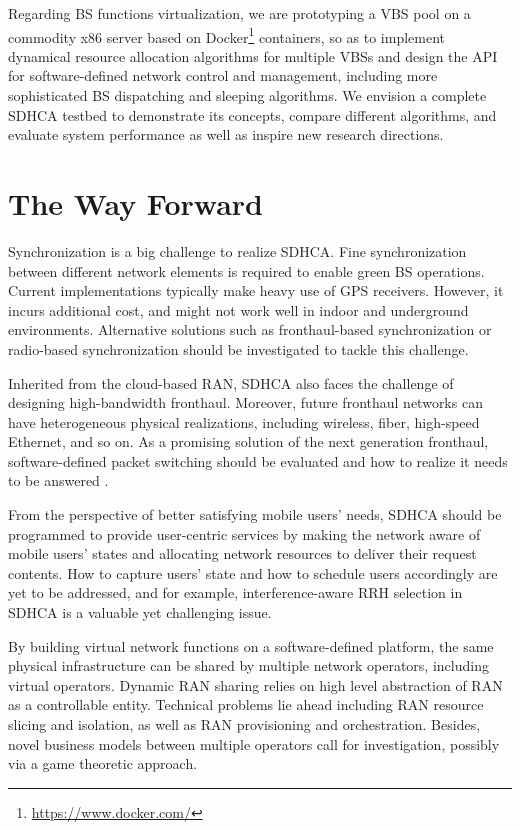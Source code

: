 \documentclass[12pt, draftclsnofoot,onecolumn]{IEEEtran}
\begin{document}
Regarding BS functions virtualization, we are prototyping a VBS pool on a commodity x86 server based on
Docker\footnote{\url{https://www.docker.com/}}
containers, so as to implement dynamical resource allocation algorithms for multiple
VBSs and design the API for software-defined network control and management, including more sophisticated BS dispatching and sleeping algorithms.
We envision a complete SDHCA testbed to demonstrate its
concepts, compare different algorithms, and evaluate system performance
as well as inspire new research directions.

\section{The Way Forward}

Synchronization is a big challenge to realize SDHCA. Fine synchronization
between different network elements is required to enable green BS operations.
Current implementations typically make heavy use of GPS receivers. However,
it incurs additional cost, and might not work well in indoor and underground
environments. Alternative solutions such as fronthaul-based synchronization or
radio-based synchronization should be investigated to tackle this challenge.

Inherited from the cloud-based RAN, SDHCA also faces the challenge of designing high-bandwidth fronthaul. Moreover, future fronthaul networks can have heterogeneous physical realizations, including wireless, fiber, high-speed Ethernet, and so on. As a promising solution of the next generation fronthaul, software-defined packet switching should be evaluated and how to realize it needs to be answered \cite{Liu2015FHN}.

From the perspective of better satisfying mobile users' needs,
SDHCA should be programmed to provide user-centric services
by making the network aware of mobile users' states and allocating network
resources to deliver their request contents.
How to capture users' state and how to schedule users accordingly are yet to be
addressed, and for example, interference-aware RRH selection in SDHCA is a valuable yet challenging issue.

By building virtual network functions on a software-defined platform, the same
physical infrastructure can be shared by multiple network operators, including
virtual operators. Dynamic RAN sharing relies on high level abstraction of RAN
as a controllable entity. Technical problems lie ahead including RAN resource
slicing and isolation, as well as RAN provisioning and orchestration. Besides,
novel business models between multiple operators call for investigation,
possibly via a game theoretic approach.
\end{document}
